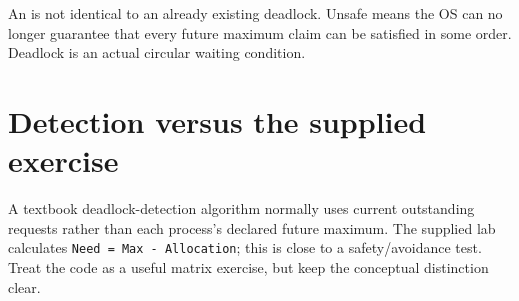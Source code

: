 \begin{pitfall}
An  is not identical to an already existing deadlock. Unsafe means the OS can no longer guarantee that every future maximum claim can be satisfied in some order. Deadlock is an actual circular waiting condition.
\end{pitfall}

\section{Detection versus the supplied exercise}
A textbook deadlock-detection algorithm normally uses current outstanding requests rather than each process's declared future maximum. The supplied lab calculates \texttt{Need = Max - Allocation}; this is close to a safety/avoidance test. Treat the code as a useful matrix exercise, but keep the conceptual distinction clear.


